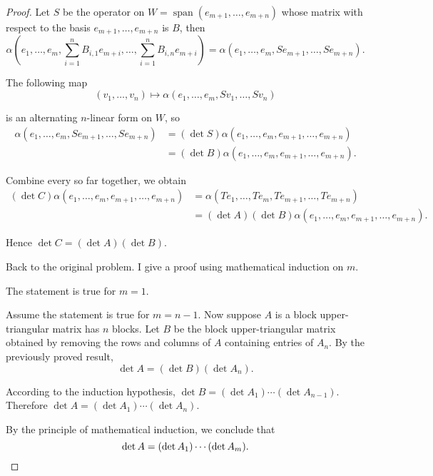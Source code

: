 \begin{proof}
    Let $S$ be the operator on $W = \operatorname{span}(e_{m+1}, \ldots, e_{m+n})$ whose matrix with respect to the basis $e_{m+1}, \ldots, e_{m+n}$ is $B$, then
    \[
        \alpha(e_{1}, \ldots, e_{m}, \sum^{n}_{i=1}B_{i,1}e_{m+i}, \ldots, \sum^{n}_{i=1}B_{i,n}e_{m+i}) = \alpha(e_{1}, \ldots, e_{m}, Se_{m+1}, \ldots, Se_{m+n}).
    \]

    The following map
    \[
        (v_{1}, \ldots, v_{n})\mapsto \alpha(e_{1}, \ldots, e_{m}, Sv_{1}, \ldots, Sv_{n})
    \]

    is an alternating $n$-linear form on $W$, so
    \begin{align*}
        \alpha(e_{1}, \ldots, e_{m}, Se_{m+1}, \ldots, Se_{m+n}) & = (\det S)\alpha(e_{1}, \ldots, e_{m}, e_{m+1}, \ldots, e_{m+n})  \\
                                                                 & = (\det B)\alpha(e_{1}, \ldots, e_{m}, e_{m+1}, \ldots, e_{m+n}).
    \end{align*}

    Combine every so far together, we obtain
    \begin{align*}
        (\det C)\alpha(e_{1}, \ldots, e_{m}, e_{m+1}, \ldots, e_{m+n}) & = \alpha(Te_{1}, \ldots, Te_{m}, Te_{m+1}, \ldots, Te_{m+n})              \\
                                                                       & = (\det A)(\det B)\alpha(e_{1}, \ldots, e_{m}, e_{m+1}, \ldots, e_{m+n}).
    \end{align*}

    Hence $\det C = (\det A)(\det B)$.

    \bigskip
    Back to the original problem. I give a proof using mathematical induction on $m$.

    The statement is true for $m = 1$.

    Assume the statement is true for $m = n - 1$. Now suppose $A$ is a block upper-triangular matrix has $n$ blocks. Let $B$ be the block upper-triangular matrix obtained by removing the rows and columns of $A$ containing entries of $A_{n}$. By the previously proved result,
    \[
        \det A = (\det B)(\det A_{n}).
    \]

    According to the induction hypothesis, $\det B = (\det A_{1})\cdots (\det A_{n-1})$. Therefore $\det A = (\det A_{1})\cdots (\det A_{n})$.

    By the principle of mathematical induction, we conclude that
    \[
        \det A = (\det A_{1})\cdots (\det A_{m}).\qedhere
    \]
\end{proof}
\newpage

